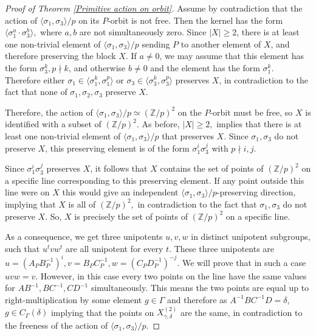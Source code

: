 \documentclass[letterpaper]{amsart}
\begin{document}
\begin{proof}[Proof of Theorem \ref{Primitive action on orbit}]
    Assume by contradiction that the action of $\langle\sigma_1, \sigma_3\rangle/p$ on its $P$-orbit is not free. Then the kernel has the form $\langle\sigma_1^a \cdot \sigma_3^b\rangle,$ where $a, b$ are not simultaneously zero. Since $|X| \geq 2$, there is at least one non-trivial element of $\langle \sigma_1, \sigma_3\rangle/p$ sending $P$ to another element of $X$, and therefore preserving the block $X$. If $a \neq 0$, we may assume that this element has the form $\sigma_3^k, p\nmid k$, and otherwise $b \neq 0$ and the element has the form $\sigma_1^k$. Therefore either $\sigma_1 \in \langle \sigma_1^k, \sigma_1^p\rangle$ or $\sigma_3 \in \langle \sigma_3^k, \sigma_3^p\rangle$ preserves $X$, in contradiction to the fact that none of $\sigma_1, \sigma_2, \sigma_3$ preserve $X$.

    Therefore, the action of $\langle \sigma_1, \sigma_3 \rangle/p \simeq (\mathbb{Z}/p)^2$ on the $P$-orbit must be free, so $X$ is identified with a subset of $(\mathbb{Z}/p)^2.$ As before, $|X| \geq 2,$ implies that there is at least one non-trivial element of $\langle \sigma_1,\sigma_3\rangle/p$ that preserves $X.$ Since $\sigma_1,\sigma_3$ do not preserve $X$, this preserving element is of the form $\sigma_1^i\sigma_3^j$ with $p\nmid i,j.$
    
    Since $\sigma_1^i\sigma_3^j$ preserves $X$, it follows that $X$ contains the set of points of $(\mathbb{Z}/p)^2$ on a specific line corresponding to this preserving element. If any point outside this line were on $X$ this would give an independent $\langle\sigma_1, \sigma_3\rangle/p$-preserving direction, implying that $X$ is all of $(\mathbb{Z}/p)^2,$ in contradiction to the fact that $\sigma_1, \sigma_3$ do not preserve $X.$ So, $X$ is precisely the set of points of $(\mathbb{Z}/p)^2$ on a specific line.

    As a consequence, we get three unipotents $u,v,w$ in distinct unipotent subgroups, such that $u^tvw^t$ are all unipotent for every $t$. These three unipotents are $u = (A_PB_P^{-1})^{i}, v = B_PC_P^{-1}, w=(C_PD_P^{-1})^{-j}.$ We will prove that in such a case $uvw = v$. However, in this case every two points on the line have the same values for $AB^{-1}, BC^{-1}, CD^{-1}$ simultaneously. This means the two points are equal up to right-multiplication by some element $g \in \Gamma$ and therefore as $A^{-1}BC^{-1}D = \delta$, $g \in C_\Gamma(\delta)$ implying that the points on $X_{\gamma,\delta}^{(2)}$ are the same, in contradiction to the freeness of the action of $\langle\sigma_1, \sigma_3\rangle/p.$


\end{proof}
\end{document}
